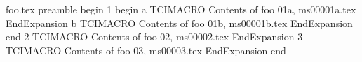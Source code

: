 foo.tex preamble
begin
1
begin
a
TCIMACRO
Contents of foo 01a, ms00001a.tex
EndExpansion
b
TCIMACRO
Contents of foo 01b, ms00001b.tex
EndExpansion
end
2
TCIMACRO
Contents of foo 02, ms00002.tex
EndExpansion
3
TCIMACRO
Contents of foo 03, ms00003.tex
EndExpansion
end
